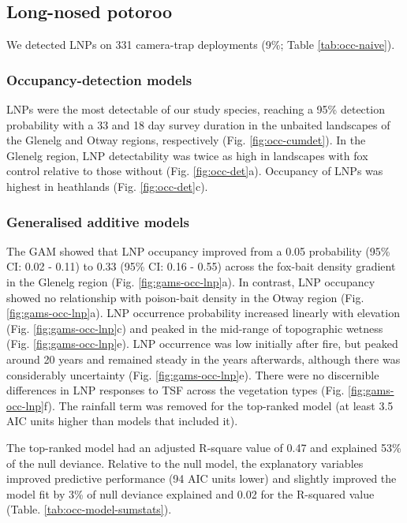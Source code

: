 \documentclass[11pt,a4paper,titlepage,twoside,openright]{style/unimelbthesis}
\begin{document}
\begin{mainmatter}
\hypertarget{long-nosed-potoroo-1}{%
\subsection{Long-nosed potoroo}\label{long-nosed-potoroo-1}}

We detected LNPs on 331 camera-trap deployments (9\%; Table \ref{tab:occ-naive}).

\hypertarget{occupancy-detection-models-4}{%
\subsubsection{Occupancy-detection models}\label{occupancy-detection-models-4}}

LNPs were the most detectable of our study species, reaching a 95\% detection probability with a 33 and 18 day survey duration in the unbaited landscapes of the Glenelg and Otway regions, respectively (Fig. \ref{fig:occ-cumdet}). In the Glenelg region, LNP detectability was twice as high in landscapes with fox control relative to those without (Fig. \ref{fig:occ-det}a). Occupancy of LNPs was highest in heathlands (Fig. \ref{fig:occ-det}c).

\hypertarget{generalised-additive-models-4}{%
\subsubsection{Generalised additive models}\label{generalised-additive-models-4}}

The GAM showed that LNP occupancy improved from a 0.05 probability (95\% CI: 0.02 - 0.11) to 0.33 (95\% CI: 0.16 - 0.55) across the fox-bait density gradient in the Glenelg region (Fig. \ref{fig:gams-occ-lnp}a). In contrast, LNP occupancy showed no relationship with poison-bait density in the Otway region (Fig. \ref{fig:gams-occ-lnp}a). LNP occurrence probability increased linearly with elevation (Fig. \ref{fig:gams-occ-lnp}c) and peaked in the mid-range of topographic wetness (Fig. \ref{fig:gams-occ-lnp}e). LNP occurrence was low initially after fire, but peaked around 20 years and remained steady in the years afterwards, although there was considerably uncertainty (Fig. \ref{fig:gams-occ-lnp}e). There were no discernible differences in LNP responses to TSF across the vegetation types (Fig. \ref{fig:gams-occ-lnp}f). The rainfall term was removed for the top-ranked model (at least 3.5 AIC units higher than models that included it).

The top-ranked model had an adjusted R-square value of 0.47 and explained 53\% of the null deviance. Relative to the null model, the explanatory variables improved predictive performance (94 AIC units lower) and slightly improved the model fit by 3\% of null deviance explained and 0.02 for the R-squared value (Table. \ref{tab:occ-model-sumstats}).


\end{mainmatter}
\end{document}
